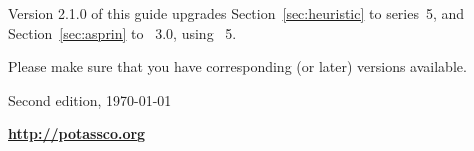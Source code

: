 \smallskip
\noindent
Version 2.1.0 of this guide upgrades Section~\ref{sec:heuristic} to \clingo{} series~5,
and Section~\ref{sec:asprin} to \asprin~3.0, using \clingo~5.

\medskip
\noindent
Please make sure that you have corresponding (or later) versions available.

\vfill

\begin{center}
  
\end{center}

\vfill

\noindent
Second edition, \today\ %

\bigskip
\noindent
{\LARGE\bf\url{http://potassco.org}}






